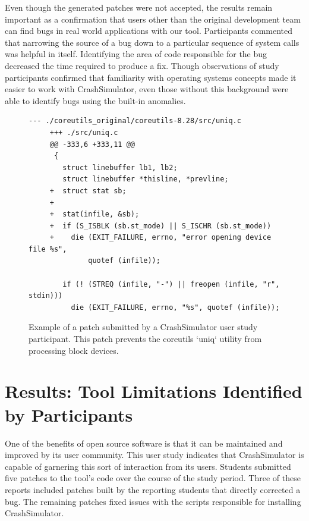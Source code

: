 Even though the generated patches were not accepted,
the results remain
important as a confirmation that 
users other than the original development team
can find bugs in real world applications with our tool.
Participants commented that narrowing the source of a bug
down to a particular sequence of system calls
was helpful in itself. Identifying the area of
code responsible for the bug decreased the time required to produce a fix.
Though observations of study participants
confirmed that familiarity with operating systems concepts
made it easier to work with CrashSimulator, even
those without this background were able to identify bugs using the
built-in anomalies.


 \begin{figure}
 \begin{lstlisting}[basicstyle=\ttfamily,gobble=4]
     --- ./coreutils_original/coreutils-8.28/src/uniq.c
     +++ ./src/uniq.c
     @@ -333,6 +333,11 @@
      {
        struct linebuffer lb1, lb2;
        struct linebuffer *thisline, *prevline;
     +  struct stat sb;
     +
     +  stat(infile, &sb);
     +  if (S_ISBLK (sb.st_mode) || S_ISCHR (sb.st_mode))
     +    die (EXIT_FAILURE, errno, "error opening device file %s",
              quotef (infile));

        if (! (STREQ (infile, "-") || freopen (infile, "r", stdin)))
          die (EXIT_FAILURE, errno, "%s", quotef (infile));
\end{lstlisting}
\caption[Participant Submitted Patch]{Example of a patch submitted by a CrashSimulator user study participant.
This patch prevents the coreutils `uniq` utility from processing block devices. }
\label{fig:participantpatch}
\end{figure}

\section{Results: Tool Limitations Identified by Participants}
\label{subsec:crashsim-patches}

One of the benefits of open source software is that it can be maintained and improved by its user community.
This user study indicates that CrashSimulator is capable of garnering this sort of interaction from its users.
Students submitted five patches
to the tool's code over the
course of the study period.
Three of these reports included patches built by the reporting students that directly
corrected a bug.
The remaining patches fixed issues with the scripts responsible for installing CrashSimulator.

